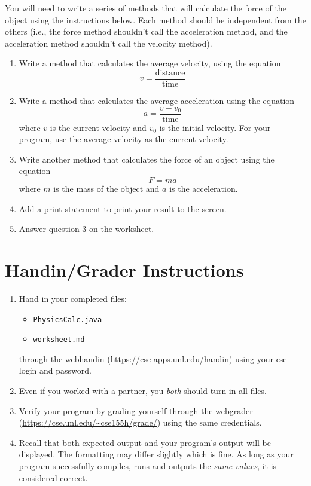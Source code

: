 \documentclass[12pt]{scrartcl}
\begin{document}
You will need to write a series of methods that will calculate the force of the 
object using the instructions below.  Each method should be independent 
from the others (i.e., the force method shouldn't call the acceleration method, 
and the acceleration method shouldn't call the velocity method).  

\begin{enumerate}
  \item Write a method that calculates the average velocity, using the equation 
	$$v = \frac{\textrm{distance}}{\textrm{time}}$$
  \item Write a method that calculates the average acceleration using the equation
	$$a = \frac{v - v_0}{\textrm{time}}$$
  	where $v$ is the current velocity and $v_0$ is the initial velocity.  For your 
	program, use the average velocity as the current velocity.
  \item Write another method that calculates the force of an object using the equation
	$$F = ma$$
	where $m$ is the mass of the object and $a$ is the acceleration.  
  \item Add a print statement to print your result to the screen.
  \item Answer question 3 on the worksheet.
\end{enumerate}


\section{Handin/Grader Instructions}

\begin{enumerate}
  \item Hand in your completed files:
    \begin{itemize}
    \item \texttt{PhysicsCalc.java}
    \item \texttt{worksheet.md}
  \end{itemize}
  through the webhandin (\url{https://cse-apps.unl.edu/handin}) 
  using your cse login and password.  
  \item Even if you worked with a partner, you \emph{both} should
  turn in all files.
  \item Verify your program by grading yourself through the
  webgrader (\url{https://cse.unl.edu/~cse155h/grade/}) using the
  same credentials.
  \item Recall that both expected output and your program's output
  will be displayed.  The formatting may differ slightly which is fine.
  As long as your program successfully compiles, runs and outputs 
  the \emph{same values}, it is considered correct.
\end{enumerate}
	
\end{document}
